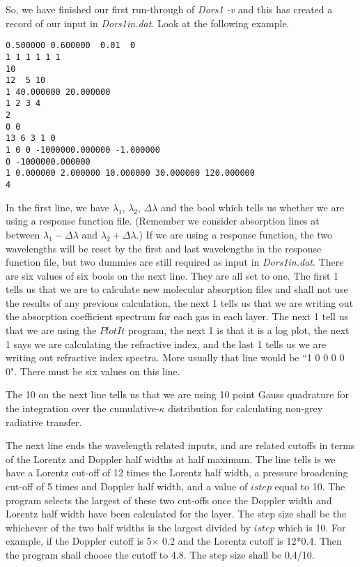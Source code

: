 \documentclass[12pt]{article}
\begin{document}
So, we have finished our first run-through of {\it Dors1 -v} and this has created a record of our input in
 {\it Dors1in.dat}. Look at the following example.
\begin{verbatim}
0.500000 0.600000  0.01  0 
1 1 1 1 1 1
10
12  5 10
1 40.000000 20.000000
1 2 3 4
2
0 0
13 6 3 1 0
1 0 0 -1000000.000000 -1.000000
0 -1000000.000000
1 0.000000 2.000000 10.000000 30.000000 120.000000
4
\end{verbatim}
In the first line, we have $\lambda_1$, $\lambda_2$, $\Delta \lambda$ and the bool which tells us whether
we are using a response function file. (Remember we consider absorption lines at between $\lambda_1-\Delta \lambda$
 and $ \lambda_2+\Delta \lambda$.) If we are using a response function, the two wavelengths
will be reset by the first and last wavelengths in the response function file, but two dummies are still required as input in
{\it Dors1in.dat}. There are six values of six bools on the next line. They are all set to one. The first 1 tells us that we are to calculate new molecular absorption files and shall not use the results of any previous calculation, the next 1 tells us that we are writing out
 the absorption coefficient spectrum for each gas in each layer. The next 1 tell us that we are using
the $PlotIt$ program, the next 1 is that it is a  log plot, the next 1 says we are calculating the refractive index, 
 and the last 1 tells us we are writing out
refractive index spectra. More usually that line would be ``1 0 0 0 0 0". There must be six values on this line.
 
The 10 on the next line tells us that we are using
10 point Gauss quadrature for the integration over the cumulative-$\kappa$ distribution for calculating non-grey 
radiative transfer. 

The next line ends the wavelength related inputs, and are related cutoffs in terms of the
Lorentz and Doppler half widths at half maximum. 
The line tells is we have a Lorentz cut-off of 12 times the Lorentz half width, a pressure broadening 
cut-off of 5 times and Doppler half width, and a value of $istep$ equal to 10. The program selects the largest of these two cut-offs once the Doppler width and Lorentz half width have been calculated for the layer.
 The step size shall be the whichever of the two half widths is the largest divided by $istep$ which is 10.
For example, if the Doppler cutoff is 5$\times$ 0.2 and the Lorentz cutoff is 12*0.4. Then the program
 shall choose the  cutoff to  4.8. The step size shall be 0.4/10.
\end{document}
